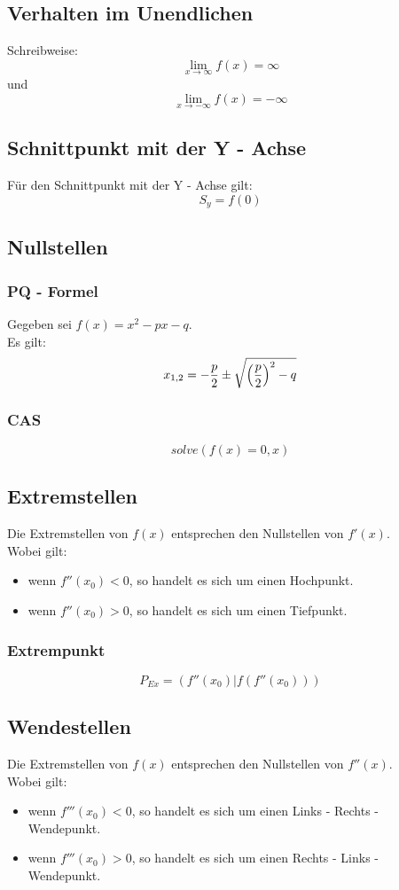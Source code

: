 \documentclass[a4paper,12pt]{article}
\begin{document}
\subsection{Verhalten im Unendlichen}
Schreibweise:
\[\lim_{x \to \infty} f(x) = \infty\]
und
\[\lim_{x \to -\infty} f(x) = -\infty\]
\subsection{Schnittpunkt mit der Y - Achse}
Für den Schnittpunkt mit der Y - Achse gilt:
$$S_y = f(0)$$
\subsection{Nullstellen}
\subsubsection{PQ - Formel}
Gegeben sei $f(x) = x^2 - px - q$.\\
Es gilt:
$$x_{1,2} = - \frac{p}{2} \pm \sqrt{\Big{(}\frac{p}{2}\Big{)}^2 - q}$$
\subsubsection{CAS}
$$solve(f(x) = 0, x)$$
\subsection{Extremstellen}
Die Extremstellen von $f(x)$ entsprechen den Nullstellen von $f'(x)$.\\
Wobei gilt:
\begin{itemize}
\item wenn $f''(x_0) < 0$, so handelt es sich um einen Hochpunkt.
\item wenn $f''(x_0) > 0$, so handelt es sich um einen Tiefpunkt.
\end{itemize}
\subsubsection{Extrempunkt}
$$P_{Ex} = (f''(x_0) | f(f''(x_0)))$$
\subsection{Wendestellen}
Die Extremstellen von $f(x)$ entsprechen den Nullstellen von $f''(x)$.\\
Wobei gilt:
\begin{itemize}
\item wenn $f'''(x_0) < 0$, so handelt es sich um einen Links - Rechts - Wendepunkt.
\item wenn $f'''(x_0) > 0$, so handelt es sich um einen Rechts - Links - Wendepunkt.
\end{itemize}
\end{document}
